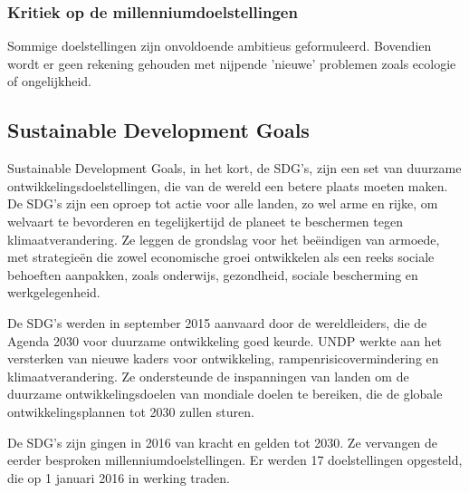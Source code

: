   \subsubsection{Kritiek op de millenniumdoelstellingen}
  Sommige doelstellingen zijn onvoldoende ambitieus geformuleerd. Bovendien wordt er geen rekening gehouden met nijpende 'nieuwe' problemen zoals ecologie of ongelijkheid.

\subsection{Sustainable Development Goals}
Sustainable Development Goals, in het kort, de SDG's, zijn een set van duurzame ontwikkelingsdoelstellingen, die van de wereld een betere plaats moeten maken. De SDG’s zijn een oproep tot actie voor alle landen, zo wel arme en rijke, om welvaart te bevorderen en tegelijkertijd de planeet te beschermen tegen klimaatverandering. Ze leggen de grondslag voor het beëindigen van armoede, met strategieën die zowel economische groei ontwikkelen als een reeks sociale behoeften aanpakken, zoals onderwijs, gezondheid, sociale bescherming en werkgelegenheid. \autocite{VerenigdeNaties2004}

De SDG's werden in september 2015 aanvaard door de wereldleiders, die de Agenda 2030 voor duurzame ontwikkeling goed keurde. UNDP werkte aan het versterken van nieuwe kaders voor ontwikkeling, rampenrisicovermindering en klimaatverandering. Ze ondersteunde de inspanningen van landen om de duurzame ontwikkelingsdoelen van mondiale doelen te bereiken, die de globale ontwikkelingsplannen tot 2030 zullen sturen.

De SDG's zijn gingen in 2016  van kracht en gelden tot 2030. Ze vervangen de eerder besproken millenniumdoelstellingen. Er werden 17 doelstellingen opgesteld, die op 1 januari 2016 in werking traden. \autocite{DevelopmentProgram2020}
 
